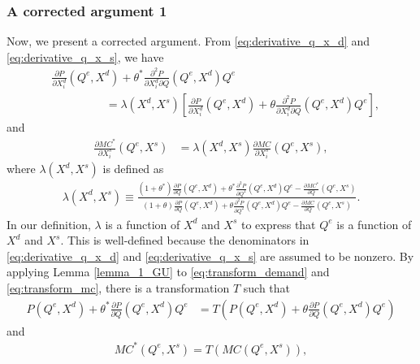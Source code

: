\documentclass[11pt, a4paper]{article}
\theoremstyle{remark}
\begin{document}
\iffalse



\subsubsection*{A corrected argument 1}
Now, we present a corrected argument.
From \eqref{eq:derivative_q_x_d} and \eqref{eq:derivative_q_x_s}, we have
\begin{align}
    &\frac{\partial P}{\partial X^{d}_{i}}(Q^e, X^{d}) + \theta^{*}\frac{\partial^2 P}{\partial X^{d}_{i}\partial Q}(Q^e, X^{d})Q^e \\
    &\hspace{2cm} = \lambda(X^{d}, X^{s})\left[\frac{\partial P}{\partial X^{d}_{i}} (Q^e, X^{d})+ \theta \frac{\partial^2 P}{\partial X^{d}_{i}\partial Q}(Q^e, X^{d})Q^e\right],\label{eq:transform_demand}
\end{align}
and
\begin{align}
    \frac{\partial MC^{*}}{\partial X^{s}_{i}}(Q^e, X^{s}) & = \lambda(X^{d}, X^{s})\frac{\partial MC}{\partial X^{s}_{i}}(Q^e, X^{s}),\label{eq:transform_mc}
\end{align}
where $\lambda(X^{d}, X^{s})$ is defined as
\begin{align}
    \lambda( X^{d}, X^{s}) \equiv \frac{(1+\theta^{*})\frac{\partial P}{\partial Q}(Q^e, X^{d}) + \theta^{*}\frac{\partial^2 P}{\partial Q^2}(Q^e, X^{d})Q^e - \frac{\partial MC^{*}}{\partial Q}(Q^e, X^{s})}{(1+\theta)\frac{\partial P}{\partial Q}(Q^e, X^{d}) + \theta\frac{\partial^2 P}{\partial Q^2}(Q^e, X^{d})Q^e - \frac{\partial MC}{\partial Q}(Q^e, X^{s})}.\label{eq:lambda_q_x}
\end{align}
In our definition, $\lambda$ is a function of $X^{d}$ and $X^{s}$ to express that $Q^e$ is a function of $X^{d}$ and $X^{s}$.
This is well-defined because the denominators in \eqref{eq:derivative_q_x_d} and \eqref{eq:derivative_q_x_s} are assumed to be nonzero.
By applying Lemma \ref{lemma_1_GU} to \eqref{eq:transform_demand} and \eqref{eq:transform_mc}, there is a transformation $T$ such that
\begin{align}
    P(Q^e, X^{d}) + \theta^{*} \frac{\partial P}{\partial Q}(Q^e, X^{d}) Q^e & = T\left(P(Q^e, X^{d}) + \theta \frac{\partial P}{\partial Q}(Q^e, X^{d}) Q^e\right) \label{eq:transformation_T_demand}
\end{align}
and
\begin{align}
    MC^{*}(Q^e, X^{s}) = T(MC(Q^e, X^{s})), \label{eq:transformation_T_mc}
\end{align}
\end{document}
